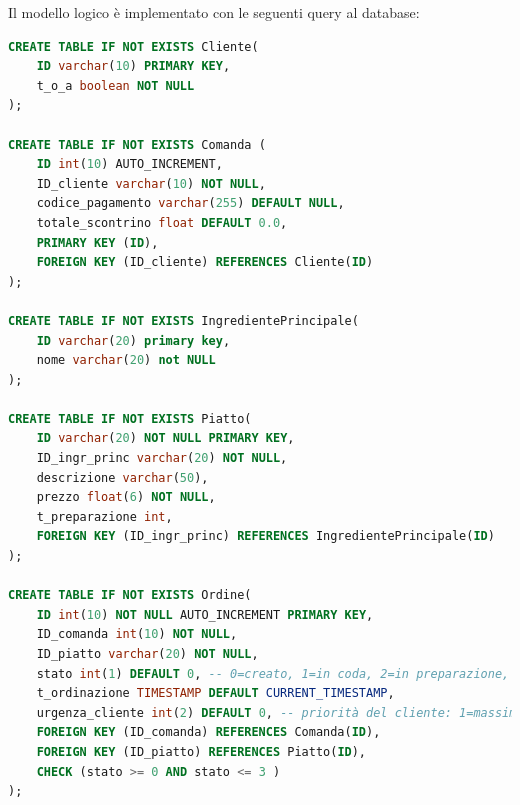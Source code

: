\newpage
Il modello logico è implementato con le seguenti query al database:

\begin{lstlisting}[language=SQL,caption=Query del database in SQL,label=lst:sqlcode]
CREATE TABLE IF NOT EXISTS Cliente(
    ID varchar(10) PRIMARY KEY,
    t_o_a boolean NOT NULL
);

CREATE TABLE IF NOT EXISTS Comanda (
    ID int(10) AUTO_INCREMENT,
    ID_cliente varchar(10) NOT NULL,
    codice_pagamento varchar(255) DEFAULT NULL,
    totale_scontrino float DEFAULT 0.0,
    PRIMARY KEY (ID),
    FOREIGN KEY (ID_cliente) REFERENCES Cliente(ID)
);

CREATE TABLE IF NOT EXISTS IngredientePrincipale(
    ID varchar(20) primary key,
    nome varchar(20) not NULL
);

CREATE TABLE IF NOT EXISTS Piatto(
    ID varchar(20) NOT NULL PRIMARY KEY,
    ID_ingr_princ varchar(20) NOT NULL,
    descrizione varchar(50),
    prezzo float(6) NOT NULL,
    t_preparazione int,
    FOREIGN KEY (ID_ingr_princ) REFERENCES IngredientePrincipale(ID)
);

CREATE TABLE IF NOT EXISTS Ordine(
    ID int(10) NOT NULL AUTO_INCREMENT PRIMARY KEY,
    ID_comanda int(10) NOT NULL,
    ID_piatto varchar(20) NOT NULL,
    stato int(1) DEFAULT 0, -- 0=creato, 1=in coda, 2=in preparazione, 3=completato
    t_ordinazione TIMESTAMP DEFAULT CURRENT_TIMESTAMP,
    urgenza_cliente int(2) DEFAULT 0, -- priorità del cliente: 1=massima, -1=minima
    FOREIGN KEY (ID_comanda) REFERENCES Comanda(ID),
    FOREIGN KEY (ID_piatto) REFERENCES Piatto(ID),
    CHECK (stato >= 0 AND stato <= 3 )
);
\end{lstlisting}

\clearpage